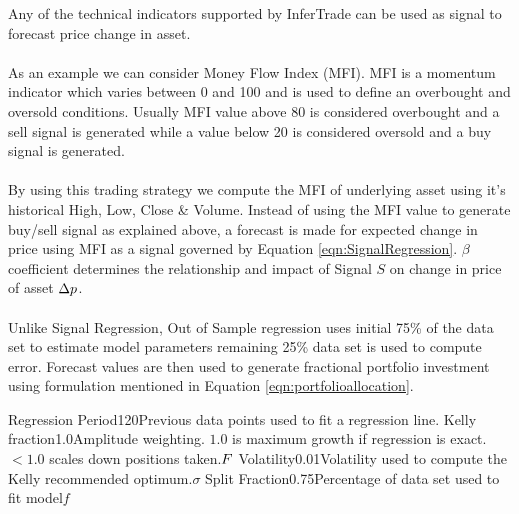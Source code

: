 \documentclass{article}
\begin{document}
\logo
{} %
\tblofcontents


\howtotrade
{Any of the technical indicators supported by InferTrade can be used as signal to forecast price change in asset. \\ \\ As an example we can consider Money Flow Index (MFI). MFI is a momentum indicator which varies between 0 and 100 and is used to define an overbought and oversold conditions. Usually MFI value above 80 is considered overbought and a sell signal is generated while a value below 20 is considered oversold and a buy signal is generated.\\ \\
By using this trading strategy we compute the MFI of underlying asset using it's historical High, Low, Close \& Volume. Instead of using the MFI value to generate buy/sell signal as explained above, a forecast is made for expected change in price using MFI as a signal governed by Equation \ref{eqn:SignalRegression}. $\beta$ coefficient determines the relationship and impact of Signal $S$ on change in price of asset $\Delta p$.\\ \\
Unlike Signal Regression, Out of Sample regression uses initial 75\% of the data set to estimate model parameters remaining 25\% data set is used to compute error. Forecast values are then used to generate fractional portfolio investment using formulation mentioned in Equation \ref{eqn:portfolioallocation}.
}

{Regression Period}{120}{Previous data points used to fit a regression line.}{\lookbacklength}
{Kelly fraction}{1.0}{Amplitude weighting. $1.0$ is maximum growth if regression is exact.
$<1.0$ scales down positions taken.}{$F$}
{Volatility}{0.01}{Volatility used to compute the Kelly recommended optimum.}{$\sigma$}
{Split Fraction}{0.75}{Percentage of data set used to fit model}{$f$}
\stoptable %
\end{document}
